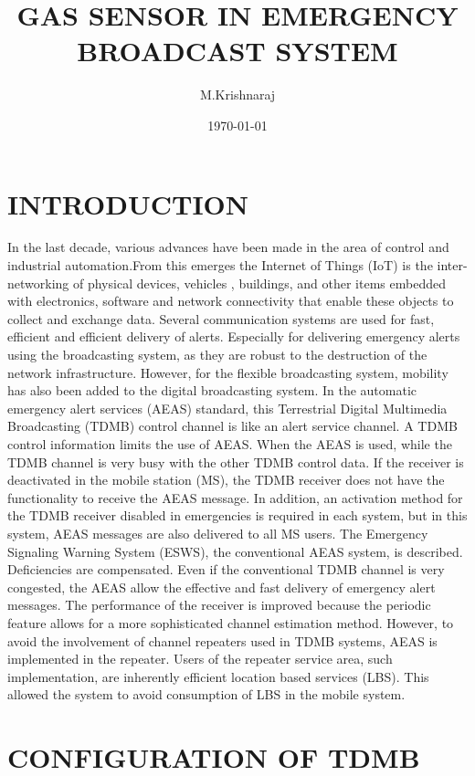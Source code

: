 \documentclass[11pt]{article}
\title{GAS SENSOR IN EMERGENCY BROADCAST SYSTEM}
\author{M.Krishnaraj}
\date{\today}
\begin{document}
\maketitle

\section{INTRODUCTION}

In the last decade, various advances have been made in the area of control and industrial automation.From this emerges the Internet of Things (IoT) is the inter-networking of physical devices, vehicles , buildings, and other items embedded with electronics, software and network connectivity that enable these objects to collect and exchange data. Several communication systems are used for fast, efficient and efficient delivery of alerts. Especially for delivering emergency alerts using the broadcasting system, as they are robust to the destruction of the network infrastructure. However, for the flexible broadcasting system, mobility has also been added to the digital broadcasting system. In the automatic emergency alert services (AEAS) standard, this  Terrestrial Digital Multimedia Broadcasting (TDMB) control channel is like an alert service channel. A TDMB control information limits the use of AEAS. When the AEAS is used, while the TDMB channel is very busy with the other TDMB control data. If the receiver is deactivated in the mobile station (MS), the TDMB receiver does not have the functionality to receive the AEAS message. In addition, an activation method for the TDMB receiver disabled in emergencies is required in each system, but in this system, AEAS messages are also delivered to all MS users. The Emergency Signaling Warning System (ESWS), the conventional AEAS system, is described. Deficiencies are compensated. Even if the conventional TDMB channel is very congested, the AEAS allow the effective and fast delivery of emergency alert messages. The performance of the receiver is improved because the periodic feature allows for a more sophisticated channel estimation method. However, to avoid the involvement of channel repeaters used in TDMB systems, AEAS is implemented in the repeater. Users of the repeater service area, such implementation, are inherently efficient location based services (LBS). This allowed the system to avoid consumption of LBS in the mobile
system.

\section{CONFIGURATION OF TDMB}
\end{document}
